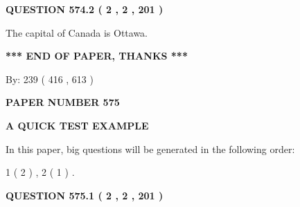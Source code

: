 \documentclass[12pt]{article}
\begin{document}
 
  
\vspace{0.2in}
  
{\textbf{\Large{QUESTION
574.2 
 ( 2 , 2 , 201 )
}}}
  
  
 
 
\noindent{}
 
 
The capital of Canada is Ottawa.
 
 
 
 
   
   
 \vspace{0.2in}
 
   
   
   
   
\vspace{1.0in} 
{\textbf{\large{ *** END OF PAPER, THANKS *** }}} 
   
   
\hspace{1.0in} By: 
 239 ( 416 ,  613 )
   
   
   
   
\newpage 
\setcounter{page}{ 
   575001 } 
   
   
   
   
 {\textbf{ \Large{ PAPER NUMBER  575  }}}
   
   
\vspace{0.2in}
   
   
   
   
   
   
 \vspace{0.2in}
{\LARGE {\textbf{ A QUICK TEST EXAMPLE}}}
   
   
   
\vspace{0.2in}
   
In this paper, big questions will be generated in the following order: 
   
   
   1 ( 2 )
 ,
   2 ( 1 )
 .
  
\vspace{0.2in}
  
{\textbf{\Large{QUESTION
575.1 
 ( 2 , 2 , 201 )
}}}
  
  
 
 
\noindent{}
 
\end{document}
